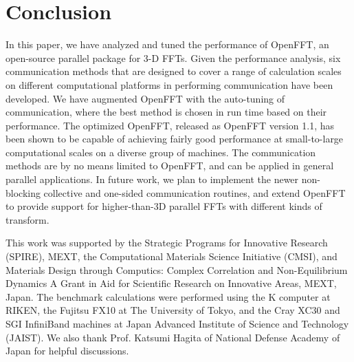 \section{Conclusion}
\label{Conclusion}
In this paper, we have analyzed and tuned the performance of OpenFFT, an open-source parallel package for 3-D FFTs. Given the performance analysis, six communication methods that are designed to cover a range of calculation scales on different computational platforms in performing communication have been developed. We have augmented OpenFFT with the auto-tuning of communication, where the best method is chosen in run time based on their performance. The optimized OpenFFT, released as OpenFFT version 1.1, has been shown to be capable of achieving fairly good performance at small-to-large computational scales on a diverse group of machines. The communication methods are by no means limited to OpenFFT, and can be applied in general parallel applications.   
In future work, we plan to implement the newer non-blocking collective and one-sided communication routines, and extend OpenFFT to provide support for higher-than-3D parallel FFTs with different kinds of transform. 







\begin{acknowledgements}
This work was supported by the Strategic Programs for Innovative Research (SPIRE), MEXT, the Computational Materials Science Initiative (CMSI), and Materials Design through Computics: Complex Correlation and Non-Equilibrium Dynamics A Grant in Aid for Scientific Research on Innovative Areas, MEXT, Japan. 
The benchmark calculations were performed using the K computer at RIKEN, the Fujitsu FX10 at The University of Tokyo, and the Cray XC30 and SGI InfiniBand machines at Japan Advanced Institute of Science and Technology (JAIST). We also thank Prof. Katsumi Hagita of National Defense Academy of Japan for helpful discussions. 
\end{acknowledgements}






















